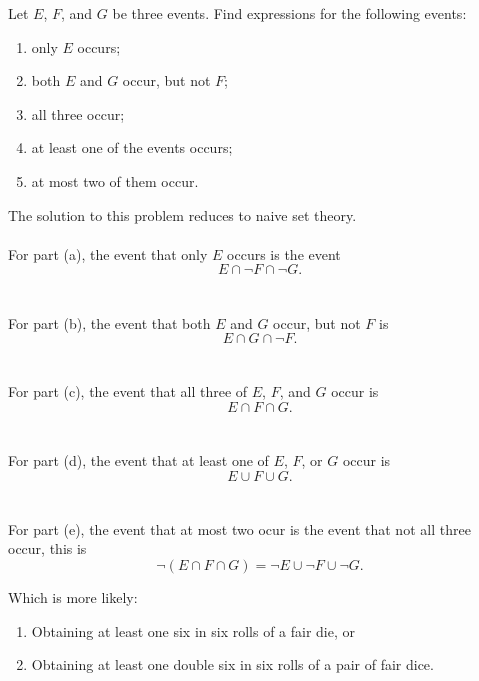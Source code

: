 \begin{problem}[Handout 1, \# 11]
  Let \(E\), \(F\), and \(G\) be three events. Find expressions for the
  following events:
  \begin{enumerate}[label=(\alph*),noitemsep]
  \item only \(E\) occurs;
  \item both \(E\) and \(G\) occur, but not \(F\);
  \item all three occur;
  \item at least one of the events occurs;
  \item at most two of them occur.
  \end{enumerate}
\end{problem}
\begin{solution}
  The solution to this problem reduces to naive set theory.
  \\\\
  For part (a), the event that only \(E\) occurs is the event
  \[
    E\cap\lnot F\cap \lnot G.
  \]
  \\\\
  For part (b), the event that both \(E\) and \(G\) occur, but not \(F\) is
  \[
    E\cap G\cap \lnot F.
  \]
  \\\\
  For part (c), the event that all three of \(E\), \(F\), and \(G\) occur
  is
  \[
    E\cap F\cap G.
  \]
  \\\\
  For part (d), the event that at least one of \(E\), \(F\), or \(G\)
  occur is
  \[
    E\cup F\cup G.
  \]
  \\\\
  For part (e), the event that at most two ocur is the event that not all
  three occur, this is
  \[
    \lnot(E\cap F\cap G)=\lnot E\cup\lnot F\cup\lnot G.
  \]
\end{solution}

\begin{problem}[Handout 1, \# 12]
  Which is more likely:
  \begin{enumerate}[label=(\alph*),noitemsep]
  \item Obtaining at least one six in six rolls of a fair die, or
  \item Obtaining at least one double six in six rolls of a pair of fair
    dice.
  \end{enumerate}
\end{problem}
\begin{solution}
\end{solution}

